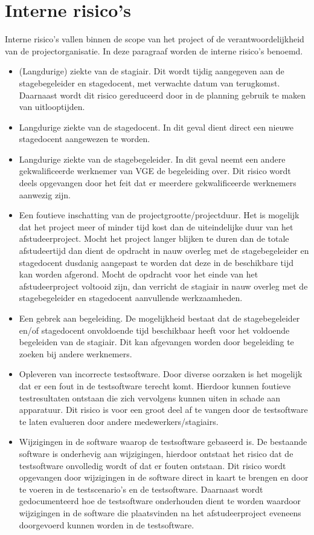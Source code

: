 \section{Interne risico's}
Interne risico's vallen binnen de scope van het project of de verantwoordelijkheid van de projectorganisatie. In deze paragraaf worden de interne risico's benoemd.\par
\begin{itemize}
\item (Langdurige) ziekte van de stagiair. Dit wordt tijdig aangegeven aan de stagebegeleider en stagedocent, met verwachte datum van terugkomst. Daarnaast wordt dit risico gereduceerd door in de planning gebruik te maken van uitlooptijden.
\item Langdurige ziekte van de stagedocent. In dit geval dient direct een nieuwe stagedocent aangewezen te worden.
\item Langdurige ziekte van de stagebegeleider. In dit geval neemt een andere gekwalificeerde werknemer van VGE de begeleiding over. Dit risico wordt deels opgevangen door het feit dat er meerdere gekwalificeerde werknemers aanwezig zijn.
\item Een foutieve inschatting van de projectgrootte/projectduur. Het is mogelijk dat het project meer of minder tijd kost dan de uiteindelijke duur van het afstudeerproject. Mocht het project langer blijken te duren dan de totale afstudeertijd dan dient de opdracht in nauw overleg met de stagebegeleider en stagedocent dusdanig aangepast te worden dat deze in de beschikbare tijd kan worden afgerond. Mocht de opdracht voor het einde van het afstudeerproject voltooid zijn, dan verricht de stagiair in nauw overleg met de stagebegeleider en stagedocent aanvullende werkzaamheden.
\item Een gebrek aan begeleiding. De mogelijkheid bestaat dat de stagebegeleider en/of stagedocent onvoldoende tijd beschikbaar heeft voor het voldoende begeleiden van de stagiair. Dit kan afgevangen worden door begeleiding te zoeken bij andere werknemers.
\item Opleveren van incorrecte testsoftware. Door diverse oorzaken is het mogelijk dat er een fout in de testsoftware terecht komt. Hierdoor kunnen foutieve testresultaten ontstaan die zich vervolgens kunnen uiten in schade aan apparatuur. Dit risico is voor een groot deel af te vangen door de testsoftware te laten evalueren door andere medewerkers/stagiairs.
\item Wijzigingen in de software waarop de testsoftware gebaseerd is. De bestaande software is onderhevig aan wijzigingen, hierdoor ontstaat het risico dat de testsoftware onvolledig wordt of dat er fouten ontstaan. Dit risico wordt opgevangen door wijzigingen in de software direct in kaart te brengen en door te voeren in de testscenario's en de testsoftware. Daarnaast wordt gedocumenteerd hoe de testsoftware onderhouden dient te worden waardoor wijzigingen in de software die plaatsvinden na het afstudeerproject eveneens doorgevoerd kunnen worden in de testsoftware.

\end{itemize}
